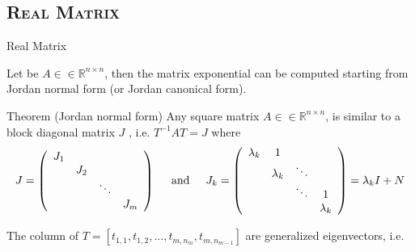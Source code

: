 \documentclass[xcolor=x11names,compress]{beamer}
\renewcommand{\(}{\begin{columns}}
\renewcommand{\)}{\end{columns}}
\newcommand{\<}[1]{\begin{column}{#1}}
\renewcommand{\>}{\end{column}}
\begin{document}
\subsection{\scshape Real Matrix}
\begin{frame}{Real Matrix}
\begin{tiny}
Let be $A ∈\in \mathbb{R}^{n\times n}$, then the matrix exponential can be computed starting from Jordan normal form (or Jordan canonical form).

Theorem (Jordan normal form) Any square matrix $A ∈\in \mathbb{R}^{n\times n}$, is similar to a block diagonal matrix $J$ , i.e. $T^{-1} AT = J$ where
\[J = \left( \begin{array}{cccc}
J_1 &           &  & \\
          & J_2 &  & \\
          &           & \ddots & \\          
          &           &  & J_m \end{array} \right) 
\hspace{.5cm}\mbox{and}\hspace{.5cm}
J_k = \left( \begin{array}{cccc}
\lambda_k &    1      &  &      \\
          & \lambda_k & \ddots & \\
          &           & \ddots & 1\\          
          &           &  & \lambda_k \end{array} \right) = \lambda_k I + N
          \] 
          
The column of $T = [t_{1,1} , t_{1,2} , . . . , t_{m,n_m} , t_{m,n_{m-1}}]$ are generalized eigenvectors, i.e.


\end{tiny}
\end{frame}
\end{document}
